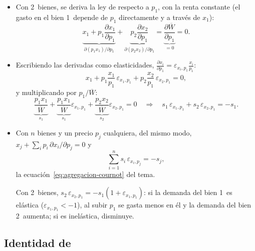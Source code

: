\documentclass[11pt]{article}
\begin{document}
\begin{itemize}
\item Con 2~bienes, se deriva la ley de  respecto a $p_1$, con la renta constante (el gasto en el bien 1~depende de $p_1$ directamente y a través de $x_1$):
  \begin{equation*}
  \underbrace{x_1+p_1\frac{\partial x_1}{\partial p_1}}_{\partial(p_1x_1)/\partial p_1}+\underbrace{p_2\frac{\partial x_2}{\partial p_1}}_{\partial(p_2x_2)/\partial p_1}=\underbrace{\frac{\partial\overline{W}}{\partial p_1}}_{=0}=0.
  \end{equation*}
\item Escribiendo las derivadas como elasticidades, $\frac{\partial x_i}{\partial p_1}=\varepsilon_{x_i,p_1}\frac{x_i}{p_1}$:
  \begin{equation*}
  x_1+p_1\frac{x_1}{p_1}\,\varepsilon_{x_1,p_1}+p_2\frac{x_2}{p_1}\,\varepsilon_{x_2,p_1}=0,
  \end{equation*}
  y multiplicando por $p_1/\overline{W}$:
  \begin{equation*}
  \underbrace{\frac{p_1x_1}{\overline{W}}}_{s_1}+\underbrace{\frac{p_1x_1}{\overline{W}}}_{s_1}\varepsilon_{x_1,p_1}+\underbrace{\frac{p_2x_2}{\overline{W}}}_{s_2}\varepsilon_{x_2,p_1}=0\quad\Longrightarrow\quad s_1\,\varepsilon_{x_1,p_1}+s_2\,\varepsilon_{x_2,p_1}=-s_1.
  \end{equation*}
\item Con $n$ bienes y un precio $p_j$ cualquiera, del mismo modo, $x_j+\sum_ip_i\,\partial x_i/\partial p_j=0$ y
  \begin{equation*}
  \sum_{i=1}^{n}s_i\,\varepsilon_{x_i,p_j}=-s_j,
  \end{equation*}
  la ecuación~\eqref{eq:agregacion-cournot} del tema.\findemo

  Con 2~bienes, $s_2\,\varepsilon_{x_2,p_1}=-s_1(1+\varepsilon_{x_1,p_1})$: si la demanda del bien 1~es elástica ($\varepsilon_{x_1,p_1}<-1$), al subir $p_1$ se gasta menos en él y la demanda del bien 2~aumenta; si es inelástica, disminuye.
\end{itemize}

\subsection{Identidad de }\label{der:roy}
\end{document}
